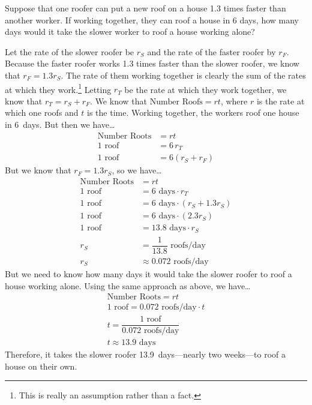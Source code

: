 \documentclass[11pt,letterpaper]{article}
\begin{document}
\newpage



 Suppose that one roofer can put a new roof on a house 1.3 times faster than another worker. If working together, they can roof a house in 6 days, how many days would it take the slower worker to roof a house working alone? \pspace

\sol Let the rate of the slower roofer be $r_S$ and the rate of the faster roofer by $r_F$. Because the faster roofer works 1.3 times faster than the slower roofer, we know that $r_F= 1.3 r_S$. The rate of them working together is clearly the sum of the rates at which they work.\footnote{This is really an assumption rather than a fact.} Letting $r_T$ be the rate at which they work together, we know that $r_T= r_S + r_F$. We know that $\text{Number Roofs}= rt$, where $r$ is the rate at which one roofs and $t$ is the time. Working together, the workers roof one house in  6~days. But then we have\dots 
	\[
	\begin{aligned}
	\text{Number Roots}&= rt \\
	1 \text{ roof}&= 6\,r_T \\
	1 \text{ roof}&= 6(r_S + r_F)
	\end{aligned}
	\]
But we know that $r_F= 1.3 r_S$, so we have\dots
	\[
	\begin{aligned}
	\text{Number Roots}&= rt \\
	1 \text{ roof}&= 6 \text{ days} \cdot r_T \\
	1 \text{ roof}&= 6 \text{ days} \cdot (r_S + 1.3r_S) \\
	1 \text{ roof}&= 6 \text{ days} \cdot (2.3r_S) \\
	1 \text{ roof}&= 13.8 \text{ days} \cdot r_S \\
	r_S&= \dfrac{1}{13.8} \text{ roofs/day} \\
	r_S&\approx 0.072 \text{ roofs/day}
	\end{aligned}
	\]
But we need to know how many days it would take the slower roofer to roof a house working alone. Using the same approach as above, we have\dots
	\[
	\begin{gathered}
	\text{Number Roots}= rt \\[0.3cm]
	1 \text{ roof}= 0.072 \text{ roofs/day} \cdot t \\[0.3cm]
	t= \dfrac{1 \text{ roof}}{0.072 \text{ roofs/day}} \\[0.3cm]
	t\approx 13.9 \text{ days}
	\end{gathered}
	\]
Therefore, it takes the slower roofer 13.9~days---nearly two weeks---to roof a house on their own. 
\end{document}

